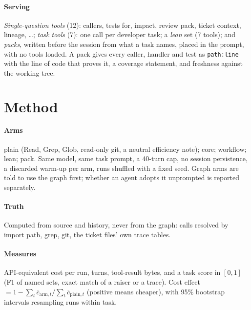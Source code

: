 \documentclass[conference]{IEEEtran}
\begin{document}
\paragraph{Serving} \emph{Single-question tools} (12): callers, tests for, impact, review pack, ticket context, lineage,
\dots; \emph{task tools} (7): one call per developer task; a \emph{lean} set (7 tools); and \emph{packs}, written
before the session from what a task names, placed in the prompt, with no tools loaded. A pack gives every caller,
handler and test as \texttt{path:line} with the line of code that proves it, a coverage statement, and freshness
against the working tree.

\section{Method}\label{sec:method}
\paragraph{Arms} plain (Read, Grep, Glob, read-only git, a neutral efficiency note); core; workflow; lean; pack. Same
model, same task prompt, a 40-turn cap, no session persistence, a discarded warm-up per arm, runs shuffled with a fixed
seed. Graph arms are told to use the graph first; whether an agent adopts it unprompted is reported separately.
\paragraph{Truth} Computed from source and history, never from the graph: calls resolved by import path, grep, git,
the ticket files' own trace tables.
\paragraph{Measures} API-equivalent cost per run, turns, tool-result bytes, and a task score in $[0,1]$ (F1 of named
sets, exact match of a raiser or a trace). Cost effect $=1-\sum_t \overline{c}_{\mathrm{arm},t}/\sum_t
\overline{c}_{\mathrm{plain},t}$ (positive means cheaper), with 95\% bootstrap intervals resampling runs within task.
\end{document}
